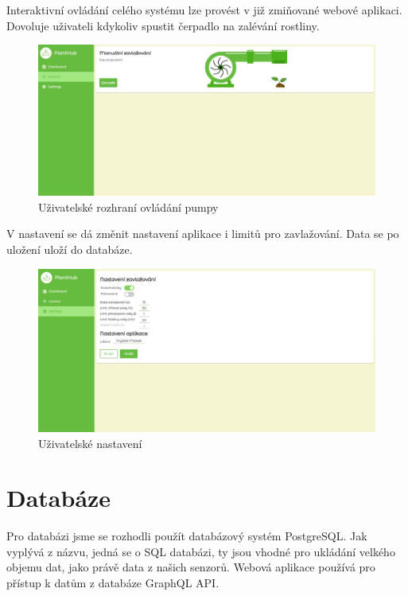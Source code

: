 \documentclass[11pt,a4paper]{article}
\begin{document}
Interaktivní ovládání celého systému lze provést v již zmiňované webové aplikaci. Dovoluje uživateli kdykoliv spustit čerpadlo na zalévání rostliny.

\begin{figure}[h]
	\centering
	\includegraphics[width=\linewidth]{web-ui-pump.png}
	\caption*{Uživatelské rozhraní ovládání pumpy}
\end{figure}

V nastavení se dá změnit nastavení aplikace i limitů pro zavlažování. Data se po uložení uloží do databáze.

\begin{figure}[h]
	\centering
	\includegraphics[width=\linewidth]{web-ui-settings.png}
	\caption*{Uživatelské nastavení}
\end{figure}

\section*{Databáze}

Pro databázi jsme se rozhodli použít databázový systém PostgreSQL. Jak vyplývá z názvu, jedná se o SQL databázi, ty jsou vhodné pro ukládání velkého objemu dat, jako právě data z našich senzorů. Webová aplikace používá pro přístup k datům z databáze GraphQL API.
\end{document}
